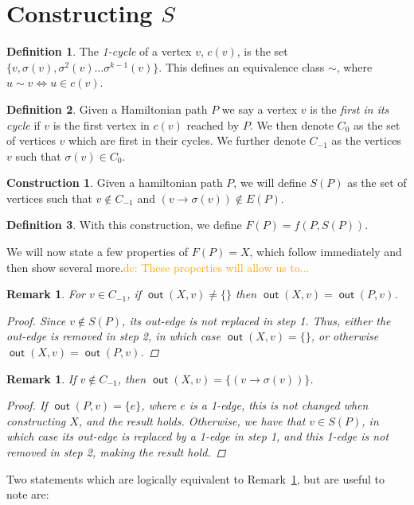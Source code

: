 \documentclass{article}
\newtheorem{rmk}[result]{Remark}
\theoremstyle{definition}
\newtheorem*{defn}{Definition}
\newtheorem*{con}{Construction}
\DeclareMathOperator{\out}{\bm{\mathsf{out}}}
\newcommand{\dc}[1]{\textcolor{orange}{dc: #1}}
\begin{document}
\section{Constructing \texorpdfstring{$S$}{S} } \label{construction}

\begin{defn} The \textit{1-cycle} of a vertex $v$, $c(v)$, is the set $\{v,\sigma(v),\sigma^2(v)\dots \sigma^{k-1}(v)\}$. This defines an equivalence class $\sim$, where $u \sim v \iff u \in c(v)$.\end{defn}

\begin{defn} Given a Hamiltonian path $P$ we say a vertex $v$ is the \textit{first in its cycle} if $v$ is the first vertex in $c(v)$ reached by $P$. We then denote $C_0$ as the set of vertices $v$ which are first in their cycles. We further denote $C_{-1}$ as the vertices $v$ such that $\sigma(v) \in C_0$.\end{defn}

\vspace{1.75em}

\begin{con} Given a hamiltonian path $P$, we will define $S(P)$ as the set of vertices such that $v \not \in C_{-1}$ and $(v \to \sigma(v)) \not \in E(P)$. \end{con}

\begin{defn} With this construction, we define $F(P) = f(P,S(P))$.\end{defn}

\vspace{1.75em}

We will now state a few properties of $F(P) = X$, which follow immediately and then show several more.\dc{ These properties will allow us to...}

\vspace{1.75em}

\begin{rmk} \label{Rule 1} For $v \in C_{-1}$, if $\out(X,v) \neq \{\}$ then $\out(X,v) = \out(P,v)$.
\begin{proof}
Since $v \not\in S(P)$, its out-edge is not replaced in step 1. Thus, either the out-edge is removed in step 2, in which case $\out(X,v) = \{\}$, or otherwise $\out(X,v) =\out(P,v)$.
\end{proof}
\end{rmk}

\begin{rmk} \label{Rule 2} If $v \not \in C_{-1}$, then $\out(X,v) = \{(v \to \sigma(v))\}$.  

\begin{proof} 
If $\out(P,v)=\{e\}$, where $e$ is a 1-edge, this is not changed when constructing $X$, and the result holds. Otherwise, we have that $v \in S(P)$, in which case its out-edge is replaced by a 1-edge in step 1, and this 1-edge is not removed in step 2, making the result hold.
\end{proof}
\end{rmk}
Two statements which are logically equivalent to Remark~\ref{Rule 2}, but are useful to note are:
\end{document}

